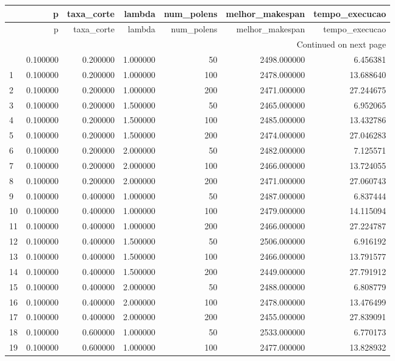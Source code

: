 \begin{longtable}{lrrrrrr}
\toprule
 & p & taxa_corte & lambda & num_polens & melhor_makespan & tempo_execucao \\
\midrule
\endfirsthead
\toprule
 & p & taxa_corte & lambda & num_polens & melhor_makespan & tempo_execucao \\
\midrule
\endhead
\midrule
\multicolumn{7}{r}{Continued on next page} \\
\midrule
\endfoot
\bottomrule
\endlastfoot
0 & 0.100000 & 0.200000 & 1.000000 & 50 & 2498.000000 & 6.456381 \\
1 & 0.100000 & 0.200000 & 1.000000 & 100 & 2478.000000 & 13.688640 \\
2 & 0.100000 & 0.200000 & 1.000000 & 200 & 2471.000000 & 27.244675 \\
3 & 0.100000 & 0.200000 & 1.500000 & 50 & 2465.000000 & 6.952065 \\
4 & 0.100000 & 0.200000 & 1.500000 & 100 & 2485.000000 & 13.432786 \\
5 & 0.100000 & 0.200000 & 1.500000 & 200 & 2474.000000 & 27.046283 \\
6 & 0.100000 & 0.200000 & 2.000000 & 50 & 2482.000000 & 7.125571 \\
7 & 0.100000 & 0.200000 & 2.000000 & 100 & 2466.000000 & 13.724055 \\
8 & 0.100000 & 0.200000 & 2.000000 & 200 & 2471.000000 & 27.060743 \\
9 & 0.100000 & 0.400000 & 1.000000 & 50 & 2487.000000 & 6.837444 \\
10 & 0.100000 & 0.400000 & 1.000000 & 100 & 2479.000000 & 14.115094 \\
11 & 0.100000 & 0.400000 & 1.000000 & 200 & 2466.000000 & 27.224787 \\
12 & 0.100000 & 0.400000 & 1.500000 & 50 & 2506.000000 & 6.916192 \\
13 & 0.100000 & 0.400000 & 1.500000 & 100 & 2466.000000 & 13.791577 \\
14 & 0.100000 & 0.400000 & 1.500000 & 200 & 2449.000000 & 27.791912 \\
15 & 0.100000 & 0.400000 & 2.000000 & 50 & 2488.000000 & 6.808779 \\
16 & 0.100000 & 0.400000 & 2.000000 & 100 & 2478.000000 & 13.476499 \\
17 & 0.100000 & 0.400000 & 2.000000 & 200 & 2455.000000 & 27.839091 \\
18 & 0.100000 & 0.600000 & 1.000000 & 50 & 2533.000000 & 6.770173 \\
19 & 0.100000 & 0.600000 & 1.000000 & 100 & 2477.000000 & 13.828932 \\

\end{longtable}
